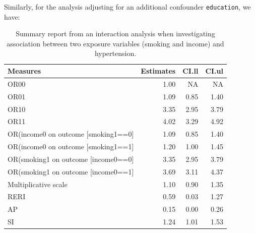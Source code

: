 \documentclass[
  letterpaper,
  DIV=11,
  numbers=noendperiod]{scrreprt}
\newenvironment{Shaded}{\begin{snugshade}}{\end{snugshade}}
\newcommand{\AttributeTok}[1]{\textcolor[rgb]{0.40,0.45,0.13}{#1}}
\newcommand{\CommentTok}[1]{\textcolor[rgb]{0.37,0.37,0.37}{#1}}
\newcommand{\ConstantTok}[1]{\textcolor[rgb]{0.56,0.35,0.01}{#1}}
\newcommand{\FunctionTok}[1]{\textcolor[rgb]{0.28,0.35,0.67}{#1}}
\newcommand{\NormalTok}[1]{\textcolor[rgb]{0.00,0.23,0.31}{#1}}
\newcommand{\OtherTok}[1]{\textcolor[rgb]{0.00,0.23,0.31}{#1}}
\newcommand{\SpecialCharTok}[1]{\textcolor[rgb]{0.37,0.37,0.37}{#1}}
\newcommand{\StringTok}[1]{\textcolor[rgb]{0.13,0.47,0.30}{#1}}
\begin{document}
Similarly, for the analysis adjusting for an additional confounder
\texttt{education}, we have:

\hypertarget{tbl-effint-fit.w.int}{}
\begin{table}[!h]
\caption{\label{tbl-effint-fit.w.int}Summary report from an interaction analysis when investigating
association between two exposure variables (smoking and income) and
hypertension. }\tabularnewline

\centering
\begin{tabular}{lrrr}
\toprule
Measures & Estimates & CI.ll & CI.ul\\
\midrule
OR00 & 1.00 & NA & NA\\
OR01 & 1.09 & 0.85 & 1.40\\
OR10 & 3.35 & 2.95 & 3.79\\
OR11 & 4.02 & 3.29 & 4.92\\
OR(income0 on outcome [smoking1==0] & 1.09 & 0.85 & 1.40\\
\addlinespace
OR(income0 on outcome [smoking1==1] & 1.20 & 1.00 & 1.45\\
OR(smoking1 on outcome [income0==0] & 3.35 & 2.95 & 3.79\\
OR(smoking1 on outcome [income0==1] & 3.69 & 3.11 & 4.37\\
Multiplicative scale & 1.10 & 0.90 & 1.35\\
RERI & 0.59 & 0.03 & 1.27\\
\addlinespace
AP & 0.15 & 0.00 & 0.26\\
SI & 1.24 & 1.01 & 1.53\\
\bottomrule
\end{tabular}
\end{table}

\begin{Shaded}
\end{Shaded}
\end{document}
